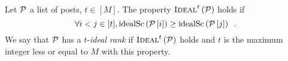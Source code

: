 \begin{definition}
  Let $\mathcal{P}$ a list of posts, $t \in [M]$. The property
  $\textsc{Ideal}^{t}\left(\mathcal{P}\right)$ holds if
  \begin{equation*}
    \forall i < j \in [t], \mathrm{idealSc}\left(\mathcal{P}\left[i\right]\right) \geq
    \mathrm{idealSc}\left(\mathcal{P}\left[j\right]\right) \enspace.
  \end{equation*}
  We say that $\mathcal{P}$ has a $t$-\emph{ideal rank} if
 $\textsc{Ideal}^{t}\left(\mathcal{P}\right)$ holds and $t$ is the maximum integer less or
  equal to $M$ with this property.

\end{definition}
